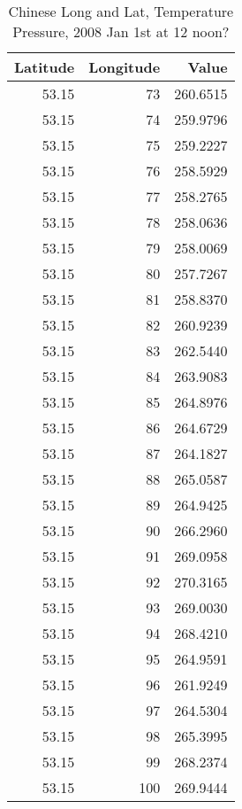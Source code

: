 \documentclass[
]{book}
\begin{document}
\begin{table}[!h]

\caption{\label{tab:unnamed-chunk-29}Chinese Long and Lat, Temperature Pressure, 2008 Jan 1st at 12 noon?}
\centering
\begin{tabular}[t]{r|r|r}
\hline
Latitude & Longitude & Value\\
\hline
\rowcolor{gray!6}  53.15 & 73 & 260.6515\\
\hline
53.15 & 74 & 259.9796\\
\hline
\rowcolor{gray!6}  53.15 & 75 & 259.2227\\
\hline
53.15 & 76 & 258.5929\\
\hline
\rowcolor{gray!6}  53.15 & 77 & 258.2765\\
\hline
53.15 & 78 & 258.0636\\
\hline
\rowcolor{gray!6}  53.15 & 79 & 258.0069\\
\hline
53.15 & 80 & 257.7267\\
\hline
\rowcolor{gray!6}  53.15 & 81 & 258.8370\\
\hline
53.15 & 82 & 260.9239\\
\hline
\rowcolor{gray!6}  53.15 & 83 & 262.5440\\
\hline
53.15 & 84 & 263.9083\\
\hline
\rowcolor{gray!6}  53.15 & 85 & 264.8976\\
\hline
53.15 & 86 & 264.6729\\
\hline
\rowcolor{gray!6}  53.15 & 87 & 264.1827\\
\hline
53.15 & 88 & 265.0587\\
\hline
\rowcolor{gray!6}  53.15 & 89 & 264.9425\\
\hline
53.15 & 90 & 266.2960\\
\hline
\rowcolor{gray!6}  53.15 & 91 & 269.0958\\
\hline
53.15 & 92 & 270.3165\\
\hline
\rowcolor{gray!6}  53.15 & 93 & 269.0030\\
\hline
53.15 & 94 & 268.4210\\
\hline
\rowcolor{gray!6}  53.15 & 95 & 264.9591\\
\hline
53.15 & 96 & 261.9249\\
\hline
\rowcolor{gray!6}  53.15 & 97 & 264.5304\\
\hline
53.15 & 98 & 265.3995\\
\hline
\rowcolor{gray!6}  53.15 & 99 & 268.2374\\
\hline
53.15 & 100 & 269.9444\\

\end{tabular}
\end{table}
\end{document}
